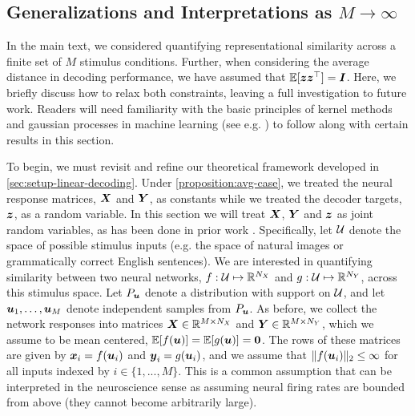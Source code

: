 \subsection{Generalizations and Interpretations as $M \rightarrow \infty$}\label{sec:asympt-limit}

In the main text, we considered quantifying representational similarity across a finite set of $M$ stimulus conditions.
Further, when considering the average distance in decoding performance, we have assumed that $\mathbb{E}[\boldsymbol{z} \boldsymbol{z}^\top] = \boldsymbol{I}$.
Here, we briefly discuss how to relax both constraints, leaving a full investigation to future work.
Readers will need familiarity with the basic principles of kernel methods and gaussian processes in machine learning (see e.g. \cite{KernelsBook,GPBook}) to follow along with certain results in this section.

To begin, we must revisit and refine our theoretical framework developed in \cref{sec:setup-linear-decoding}.
Under \cref{proposition:avg-case}, we treated the neural response matrices, $\boldsymbol{X}$ and $\boldsymbol{Y}$, as constants while we treated the decoder targets, $\boldsymbol{z}$, as a random variable.
In this section we will treat $\boldsymbol{X}$, $\boldsymbol{Y}$ and $\boldsymbol{z}$ as joint random variables, as has been done in prior work \cite{pospisil2024estimating,BoixAdsera2022}.
Specifically, let $\mathcal{U}$ denote the space of possible stimulus inputs (e.g. the space of natural images or grammatically correct English sentences).
We are interested in quantifying similarity between two neural networks, $f : \mathcal{U} \mapsto \mathbb{R}^{N_X}$ and $g : \mathcal{U} \mapsto \mathbb{R}^{N_Y}$, across this stimulus space.
Let $P_{\boldsymbol{u}}$ denote a distribution with support on $\mathcal{U}$, and let $\boldsymbol{u}_1, \dots, \boldsymbol{u}_M$ denote independent samples from $P_{\boldsymbol{u}}$.
As before, we collect the network responses into matrices $\boldsymbol{X} \in \mathbb{R}^{M \times N_X}$ and $\boldsymbol{Y} \in \mathbb{R}^{M \times N_Y}$, which we assume to be mean centered, $\mathbb{E}[f(\boldsymbol{u})] = \mathbb{E}[g(\boldsymbol{u})] = \boldsymbol{0}$.
The rows of these matrices are given by $\boldsymbol{x}_i = f(\boldsymbol{u}_i)$ and $\boldsymbol{y}_i = g(\boldsymbol{u}_i)$, and we assume that $\|f(\boldsymbol{u}_i) \|_2 \le \infty$ for all inputs indexed by $i \in \{1, ..., M \}$.  
This is a common assumption that can be interpreted in the neuroscience sense as assuming neural firing rates are bounded from above (they cannot become arbitrarily large).  
 

